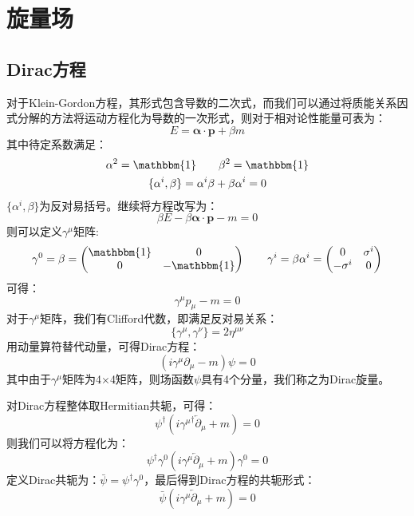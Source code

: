 \chapter{旋量场}
\section{Dirac方程}
对于Klein-Gordon方程，其形式包含导数的二次式，而我们可以通过将质能关系因式分解的方法将运动方程化为导数的一次形式，则对于相对论性能量可表为：
\begin{equation}
E=\boldsymbol{\alpha}\cdot\boldsymbol{p}+\beta m
\end{equation}
其中待定系数满足：
\begin{gather}
\alpha^2=\mathbbm{1}\qquad\beta^2=\mathbbm{1}\notag\\
\{\alpha^i,\beta\}=\alpha^i\beta+\beta\alpha^i=0
\end{gather}
$\{\alpha^i,\beta\}$为反对易括号。继续将方程改写为：
\begin{equation}
\beta E-\beta\boldsymbol{\alpha}\cdot\boldsymbol{p}-m=0
\end{equation}
则可以定义$\gamma^\mu$矩阵:
\begin{equation}
\gamma^0=\beta=\begin{pmatrix}
\mathbbm{1}&	0\\
0&	-\mathbbm{1}
\end{pmatrix}\qquad
\gamma^i=\beta\alpha^i=\begin{pmatrix}
0&	\sigma^i\\
-\sigma^i&	0
\end{pmatrix}
\end{equation}
可得：
\begin{equation}
\gamma^\mu p_\mu-m=0
\end{equation}
对于$\gamma^\mu$矩阵，我们有Clifford代数，即满足反对易关系：
\begin{equation}
\{\gamma^\mu,\gamma^\nu\}=2\eta^{\mu\nu}
\end{equation}
用动量算符替代动量，可得Dirac方程：
\begin{equation}
(i\gamma^\mu\partial_\mu-m)\psi=0
\end{equation}
其中由于$\gamma^\mu$矩阵为4$\times$4矩阵，则场函数$\psi$具有4个分量，我们称之为Dirac旋量。

对Dirac方程整体取Hermitian共轭，可得：
\begin{equation}
\psi^\dagger(i{\gamma^\mu}^\dagger\overleftarrow{\partial}_\mu+m)=0
\end{equation}
则我们可以将方程化为：
\begin{equation}
\psi^\dagger\gamma^0(i{\gamma^\mu}\overleftarrow{\partial}_\mu+m)\gamma^0=0
\end{equation}
定义Dirac共轭为：$\bar{\psi}=\psi^\dagger\gamma^0$，最后得到Dirac方程的共轭形式：
\begin{equation}
\bar{\psi}(i{\gamma^\mu}\overleftarrow{\partial}_\mu+m)=0\label{eq:diraccong}
\end{equation}
